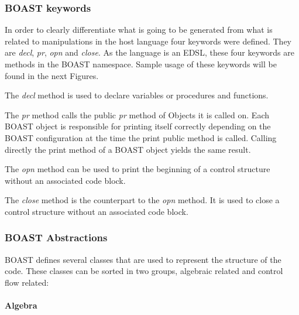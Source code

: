 \documentclass[11pt, a4paper, twoside]{montblanc}
\begin{document}
    \subsubsection{BOAST keywords}

In order to clearly differentiate what is going to be generated from what is
related to manipulations in the host language four keywords were defined. They
are \emph{decl}, \emph{pr}, \emph{opn} and \emph{close}. As the language is an
EDSL, these four keywords are methods in the BOAST namespace. Sample usage of
these keywords will be found in the next Figures.

The \emph{decl} method is used to declare variables or procedures and functions.

The \emph{pr} method calls the public \emph{pr} method of Objects it is
called on. Each BOAST object is responsible for printing itself correctly
depending on the BOAST configuration at the time the print public method is
called. Calling directly the print method of a BOAST object yields the same
result.

The \emph{opn} method can be used to print the beginning of a control
structure without an associated code block.

The \emph{close} method is the counterpart to the \emph{opn} method. It is used
to close a control structure without an associated code block.

    \subsubsection{BOAST Abstractions}

BOAST defines several classes that are used to represent the structure of the
code. These classes can be sorted in two groups, algebraic related and control
flow related:

      \paragraph{Algebra}
\end{document}
